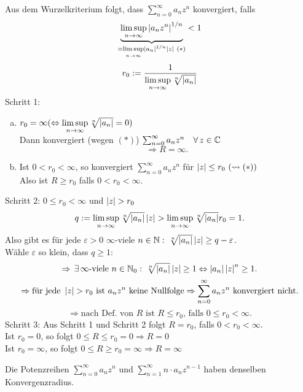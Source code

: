 \documentclass[../ana1.tex]{subfiles}
\begin{document}
\begin{bew}
    Aus dem Wurzelkriterium folgt, dass \( \sum_{n=0}^\infty a_n z^n \) konvergiert, falls
    \[ \underbrace{ \limsup\limits_{n\rightarrow\infty} \left|a_n z^n\right|^{1/n} }_{ =\limsup\limits_{n\rightarrow\infty} \left|a_n\right|^{1/n} \left|z\right| \ (*) } < 1 \]
    \[ r_0 := \frac{1}{ \limsup\limits_{n\rightarrow\infty} \sqrt[n]{\left|a_n\right|} } \]
    Schritt 1: 
    \begin{enumerate}[(a)]
        \item \( r_0 = \infty (\Leftrightarrow \limsup\limits_{n\rightarrow\infty} \sqrt[n]{ \left|a_n\right| } = 0) \) \\
        Dann konvergiert (wegen \( (*) \)) \( \sum_{n=0}^\infty a_n z^n \quad \forall \, z\in\mathbb{C} \)
        \[ \Rightarrow R = \infty. \]
        \item Ist \( 0 < r_0 < \infty \), so konvergiert \( \sum_{n=0}^\infty a_n z^n \) für \( \left|z\right| \leq r_0 \ (\leadsto (*) ) \) \\
        Also ist \( R \geq r_0 \) falls \( 0 < r_0 < \infty \).
    \end{enumerate}
    Schritt 2: \( 0 \leq r_0 < \infty \) und \( \left|z\right| > r_0 \)
    \[ q := \limsup\limits_{n\rightarrow\infty} \sqrt[n]{\left|a_n\right|} \left|z\right| > \limsup\limits_{n\rightarrow\infty} \sqrt[n]{\left|a_n\right|} r_0 = 1. \]
    Also gibt es für jede \( \varepsilon > 0 \) \( \infty \)-viele \( n\in\mathbb{N} \,\colon \, \sqrt[n]{\left|a_n\right|} \left|z\right| \geq q - \varepsilon \).\\
    Wähle \(\varepsilon \) so klein, dass \( q\geq 1 \):\\
    \[ \Rightarrow \, \exists \, \infty \text{-viele } n\in\mathbb{N}_0 \,\colon \, \sqrt[n]{\left|a_n\right|} \left|z\right| \geq 1 \Leftrightarrow \left|a_n\right| \left|z\right|^n \geq 1. \]
    \[ \Rightarrow \text{für jede } \left|z\right| > r_0 \text{ ist } a_n z^n \text{ keine Nullfolge} \Rightarrow \sum_{n=0}^\infty a_n z^n \text{ konvergiert nicht.} \]
    \[ \Rightarrow \text{nach Def.\ von } R \text{ ist } R \leq r_0 \text{, falls } 0\leq r_0 < \infty. \]
    Schritt 3: Aus Schritt 1 und Schritt 2 folgt \( R = r_0 \), falls \( 0 < r_0 < \infty \).\\
    Ist \( r_0 = 0 \), so folgt \(0 \leq R \leq r_0 = 0 \Rightarrow R = 0 \) \\
    Ist \( r_0 = \infty \), so folgt \(0 \leq R \geq r_0 = \infty \Rightarrow R = \infty \) \\
\end{bew}
\begin{kor}
    Die Potenzreihen \( \sum_{n=0}^\infty a_n z^n \) und \( \sum_{n=1}^\infty n \cdot a_n z^{n-1} \) haben denselben Konvergenzradius.
\end{kor}
\end{document}
